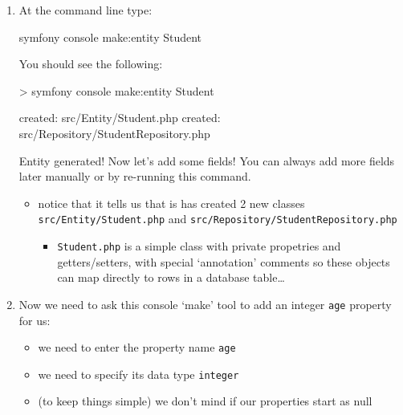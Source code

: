 \documentclass[a4paperpaper,openright]{book}
\newenvironment{Shaded}{}{}
\newcommand{\ExtensionTok}[1]{#1}
\newcommand{\NormalTok}[1]{#1}
\newcommand{\OperatorTok}[1]{\textcolor[rgb]{0.40,0.40,0.40}{#1}}
\newcommand{\StringTok}[1]{\textcolor[rgb]{0.25,0.44,0.63}{#1}}
\providecommand{\tightlist}{%
  \setlength{\itemsep}{0pt}\setlength{\parskip}{0pt}}
\begin{document}
\begin{enumerate}
\def\labelenumi{\arabic{enumi}.}
\item
  At the command line type:

\begin{Shaded}
\begin{Highlighting}[]
    \ExtensionTok{symfony}\NormalTok{ console make:entity Student}
\end{Highlighting}
\end{Shaded}

  You should see the following:

\begin{Shaded}
\begin{Highlighting}[]
  \OperatorTok{>} \ExtensionTok{symfony}\NormalTok{ console make:entity Student}

  \ExtensionTok{created}\NormalTok{: src/Entity/Student.php}
  \ExtensionTok{created}\NormalTok{: src/Repository/StudentRepository.php}

  \ExtensionTok{Entity}\NormalTok{ generated! Now let}\StringTok{'s add some fields!}
\StringTok{  You can always add more fields later manually or by re-running this command.}
\end{Highlighting}
\end{Shaded}

  \begin{itemize}
  \item
    notice that it tells us that is has created 2 new classes
    \texttt{src/Entity/Student.php} and
    \texttt{src/Repository/StudentRepository.php}

    \begin{itemize}
    \tightlist
    \item
      \texttt{Student.php} is a simple class with private propetries and
      getters/setters, with special `annotation' comments so these
      objects can map directly to rows in a database table\ldots{}
    \end{itemize}
  \end{itemize}
\item
  Now we need to ask this console `make' tool to add an integer
  \texttt{age} property for us:

  \begin{itemize}
  \item
    we need to enter the property name \texttt{age}
  \item
    we need to specify its data type \texttt{integer}
  \item
    (to keep things simple) we don't mind if our properties start as
    null


\end{itemize}
\end{enumerate}
\end{document}
